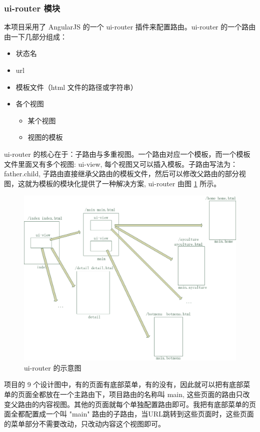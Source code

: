 \documentclass[UTF8]{ctexbook}
\begin{document}
{{            \subsubsection{ui-router 模块}
              \label{subsubsec:ui_router_模块}
                本项目采用了 AngularJS 的一个 ui-router 插件来配置路由。ui-router 的一个路由由一下几部分组成：
                \begin{itemize}
                  \item 状态名
                  \item url
                  \item 模板文件（html 文件的路径或字符串）
                  \item 各个视图
                  \begin{itemize}
                    \item 某个视图
                    \item 视图的模板
                  \end{itemize}
                \end{itemize}
                ui-router 的核心在于：子路由与多重视图。一个路由对应一个模板，而一个模板文件里面又有多个视图: ui-view, 每个视图又可以插入模板。子路由写法为：father.child, 子路由直接继承父路由的模板文件，然后可以修改父路由的部分视图，这就为模板的模块化提供了一种解决方案, ui-router 由图 \ref{fig:ui_view} 所示。
                \begin{figure}[H]
                  \centering
                  \includegraphics[width=12cm]{./img/ui_view.png}
                  \caption{ui-router 的示意图}
                  \label{fig:ui_view}
                \end{figure}
                项目的 9 个设计图中，有的页面有底部菜单，有的没有，因此就可以把有底部菜单的页面全都放在一个主路由下，项目路由的名称叫 main, 这些页面的路由只改变父路由的内容视图。其他的页面就每个单独配置路由即可。我把有底部菜单的页面全都配置成一个叫 "main" 路由的子路由，当URL跳转到这些页面时，这些页面的菜单部分不需要改动，只改动内容这个视图即可。

}}
\end{document}
